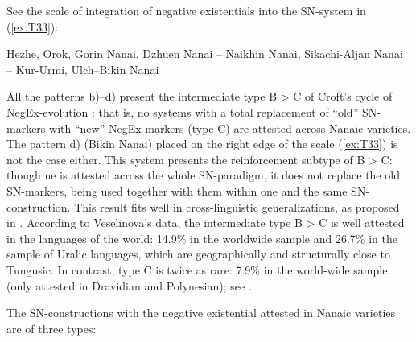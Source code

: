 \documentclass[output=paper]{langscibook}
\begin{document}
See the scale of integration of negative existentials into the SN-system in (\ref{ex:T33}):

\begin{exe}\label{ex:T33}
    \ex Hezhe, Orok, Gorin Nanai, Dzhuen Nanai – Naikhin Nanai, Sikachi-Aljan Nanai – Kur-Urmi, Ulch–Bikin Nanai
\end{exe}

All the patterns b)–d) present the intermediate type B > C of Croft’s cycle of NegEx-evolution \citeyearpar{Croft1991}: that is, no systems with a total replacement of “old” SN-markers with “new” NegEx-markers (type C) are attested across Nanaic varieties. The pattern d) (Bikin Nanai) placed on the right edge of the scale (\ref{ex:T33}) is not the case either. This system presents the reinforcement subtype of B > C: though ne is attested across the whole SN-paradigm, it does not replace the old SN-markers, being used together with them within one and the same SN-construction. This result fits well in cross-linguistic generalizations, as proposed in \citet{Veselinova2016}. According to Veselinova’s data, the intermediate type B > C is well attested in the languages of the world: 14.9\% in the worldwide sample and 26.7\% in the sample of Uralic languages, which are geographically and structurally close to Tungusic. In contrast, type C is twice as rare: 7.9\% in the world-wide sample (only attested in Dravidian and Polynesian); see \citet[150]{Veselinova2016}.

The SN-constructions with the negative existential attested in Nanaic varieties are of three types:
\end{document}

